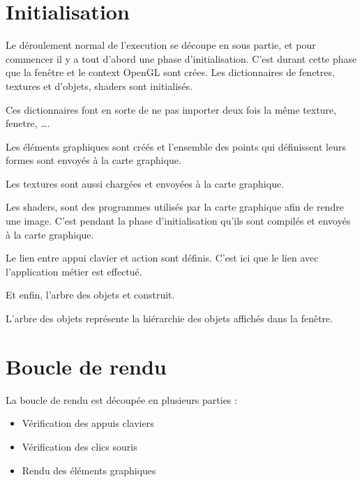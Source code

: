 \documentclass[a4paper]{report}
\begin{document}
    \section{Initialisation}

    Le déroulement normal de l'execution se découpe en sous partie, et pour commencer il y a tout d'abord une phase d'initialisation.
    C'est durant cette phase que la fenêtre et le context OpenGL sont crées.
    Les dictionnaires de fenetres, textures et d'objets, shaders sont initialisés.

    \vspace{5mm}

    Ces dictionnaires font en sorte de ne pas importer deux fois la même texture, fenetre, \ldots.

    \vspace{5mm}

    Les éléments graphiques sont créés et l'ensemble des points qui définissent leurs formes sont envoyés à la carte
    graphique.

    \vspace{5mm}

    Les textures sont aussi chargées et envoyées à la carte graphique.

    \vspace{5mm}

    Les shaders, sont des programmes utilisés par la carte graphique afin de rendre une image. C'est pendant la phase
    d'initialisation qu'ils sont compilés et envoyés à la carte graphique.

    \vspace{5mm}

    Le lien entre appui clavier et action sont définis. C'est ici que le lien avec l'application métier est effectué.

    \vspace{5mm}

    Et enfin, l'arbre des objets et construit.

    \vspace{5mm}

    L'arbre des objets représente la hiérarchie des objets affichés dans la fenêtre.

    \section{Boucle de rendu}

    La boucle de rendu est découpée en plusieurs parties :
\begin{itemize}
    \item Vérification des appuis claviers
    \item Vérification des clics souris
    \item Rendu des éléments graphiques
\end{itemize}
\end{document}
